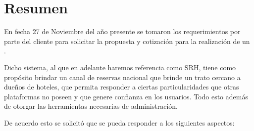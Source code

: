 \section{Resumen}

En fecha 27 de Noviembre del año presente se tomaron los requerimientos por parte del cliente para solicitar la propuesta y cotización para la realización de un . 

Dicho sistema, al que en adelante haremos referencia como SRH, tiene como propósito brindar un canal de reservas nacional que brinde un trato cercano a dueños de hoteles, que permita responder a ciertas particularidades que otras plataformas no poseen y que genere confianza en los usuarios. Todo esto además de otorgar las herramientas necesarias de administración.

De acuerdo esto se solicitó que se pueda responder a los siguientes aspectos:

